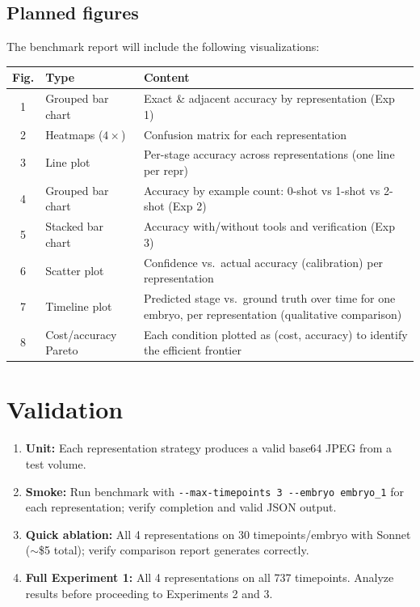 \documentclass[11pt, a4paper]{article}
\begin{document}
\subsection{Planned figures}

The benchmark report will include the following visualizations:

\begin{center}
\small
\begin{tabularx}{\textwidth}{@{}clX@{}}
\toprule
\textbf{Fig.} & \textbf{Type} & \textbf{Content} \\
\midrule
1 & Grouped bar chart
  & Exact \& adjacent accuracy by representation (Exp 1) \\
2 & Heatmaps ($4\times$)
  & Confusion matrix for each representation \\
3 & Line plot
  & Per-stage accuracy across representations (one line per repr) \\
4 & Grouped bar chart
  & Accuracy by example count: 0-shot vs 1-shot vs 2-shot (Exp 2) \\
5 & Stacked bar chart
  & Accuracy with/without tools and verification (Exp 3) \\
6 & Scatter plot
  & Confidence vs.\ actual accuracy (calibration) per representation \\
7 & Timeline plot
  & Predicted stage vs.\ ground truth over time for one embryo,
    per representation (qualitative comparison) \\
8 & Cost/accuracy Pareto
  & Each condition plotted as (cost, accuracy) to identify the
    efficient frontier \\
\bottomrule
\end{tabularx}
\end{center}

\section{Validation}

\begin{enumerate}[leftmargin=*, itemsep=4pt]
  \item \textbf{Unit:} Each representation strategy produces a valid base64 JPEG
    from a test volume.
  \item \textbf{Smoke:} Run benchmark with \texttt{-{}-max-timepoints 3
    -{}-embryo embryo\_1} for each representation; verify completion and valid
    JSON output.
  \item \textbf{Quick ablation:} All 4 representations on 30
    timepoints/embryo with Sonnet ($\sim$\$5 total); verify comparison report
    generates correctly.
  \item \textbf{Full Experiment 1:} All 4 representations on all 737 timepoints.
    Analyze results before proceeding to Experiments 2 and 3.
\end{enumerate}
\end{document}
